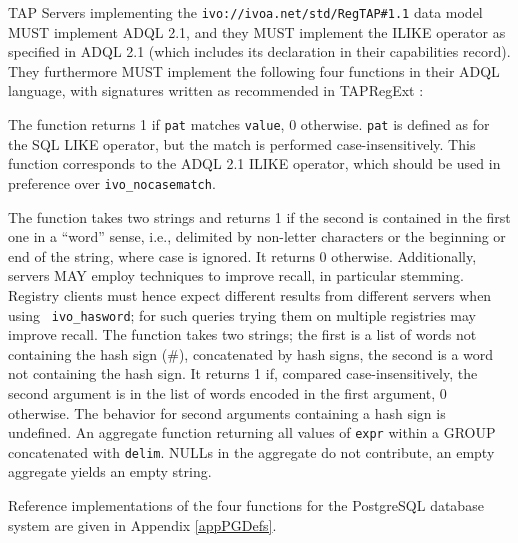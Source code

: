 \documentclass[11pt,a4paper]{ivoa}
\newcommand{\rtent}[1]{\texttt{\color{rtcolor} #1}}
\begin{document}
\label{adqludf}

TAP Servers implementing the 
\texttt{ivo://ivoa.net/std/RegTAP\#1.1} data model MUST implement
ADQL 2.1, and they MUST implement
the ILIKE operator as specified in ADQL 2.1 (which includes its
declaration in their capabilities record).  They furthermore MUST
implement the following four functions in their ADQL language,
with signatures written as recommended in TAPRegExt \citep{std:TAPREGEXT}:


\begin{bigdescription}
The function returns 1 if \texttt{pat}  matches
\texttt{value}, 0 otherwise.
\texttt{pat}  is defined as for the SQL LIKE operator, but the
match is performed case-insensitively.  This function corresponds to
the ADQL 2.1 ILIKE operator, which should be used in preference over
\texttt{ivo\_nocasematch}.

The function takes two strings and returns 1 if the second is
contained in the first one in a ``word'' sense, i.e., delimited by
non-letter characters or the beginning or end of the string, where case
is ignored.  It returns 0 otherwise.
Additionally, servers MAY employ techniques to improve recall, in
particular stemming.  Registry clients must hence expect different results
from different servers when using \rtent{ivo\_hasword}; for such
queries trying them on multiple registries may improve recall.
The function takes two strings; the first is a list of words not
containing the hash sign (\#), concatenated by hash signs, the second is
a word not containing the hash sign.  It returns 1 if, compared
case-insensitively, the second argument is in the list of words encoded in
the first argument, 0 otherwise.  The behavior for second
arguments containing a hash sign is undefined.
An aggregate function returning all values of
\texttt{expr} within a GROUP concatenated with 
\texttt{delim}.  NULLs in the aggregate do not contribute, an empty 
aggregate yields an empty string.

\end{bigdescription}

Reference implementations of the four functions for the PostgreSQL
database system are given in Appendix \ref{appPGDefs}.
\end{document}
